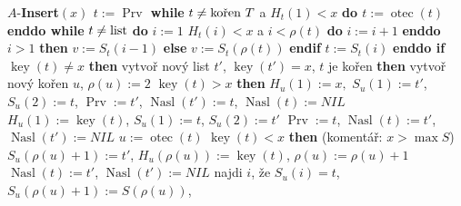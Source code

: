\documentclass[a4paper,12pt]{article}
\DeclareMathOperator*{\otec}{otec}
\DeclareMathOperator*{\Prv}{Prv}
\DeclareMathOperator*{\Nasl}{Nasl}
\DeclareMathOperator*{\key}{key}
\begin{document}
$A$-{\bf Insert$(x)$\newline 
$t:=\Prv$\newline
while} $t\ne\text{\rm kořen }T$ a $H_t(1)<x$ {\bf do $t:=\otec(t)$ enddo\newline 
while} $t\ne\text{\rm list}$ {\bf do}\newline 
\phantom{---}$i:=1$\newline 
\phantom{---}{\bf while} $H_t(i)<x$ a $i<\rho (t)$ {\bf do} $i:=i+1$ {\bf enddo}\newline 
\phantom{---}{\bf if} $i>1$ {\bf then} $v:=S_t(i-1)$ {\bf else} $v:=S_t(\rho (t))$ {\bf endif}\newline 
\phantom{---}$t:=S_t(i)$\newline 
{\bf enddo\newline 
if} $\key(t)\ne x$ {\bf then\newline }
\phantom{---}vytvoř nový list $t'$, $\key(t')=x$,\newline
\phantom{---}{\bf if} $t$ je kořen {\bf then}\newline 
\phantom{------}vytvoř nový kořen $u$, $\rho (u):=2$\newline 
\phantom{------}{\bf if} $\key(t)>x$ {\bf then}\newline 
\phantom{---------}$H_u(1):=x,$ $S_u(1):=t'$, $S_u(2):=t$,\newline
\phantom{---------}$\Prv:=t'$, $\Nasl(t'):=t$, $\Nasl(t):=NIL$\newline 
\phantom{------}{\bf else}\newline 
\phantom{---------}$H_u(1):=\key(t)$, $S_u(1):=t$, $S_u(2):=t'$\newline
\phantom{---------}$\Prv:=t$, $\Nasl(t):=t'$, $\Nasl(t'):=NIL$\newline 
\phantom{------}{\bf endif}\newline 
\phantom{---}{\bf else}\newline 
\phantom{------}$u:=\otec(t)$\newline 
\phantom{------}{\bf if} $\key(t)<x$ {\bf then}\newline  
(komentář: $x>\max S$)\newline 
\phantom{---------}$S_u(\rho (u)+1):=t'$, $H_u(\rho(u)):=\key(t)$, $\rho(u):=\rho(u)+1$\newline 
\phantom{---------}$\Nasl(t):=t'$, $\Nasl(t'):=NIL$\newline 
\phantom{------}{\bf else}\newline 
\phantom{---------}najdi $i$, že $S_u(i)=t$, $S_u(\rho(u)+1):=S(\rho(u))$,\newline 
\end{document}
